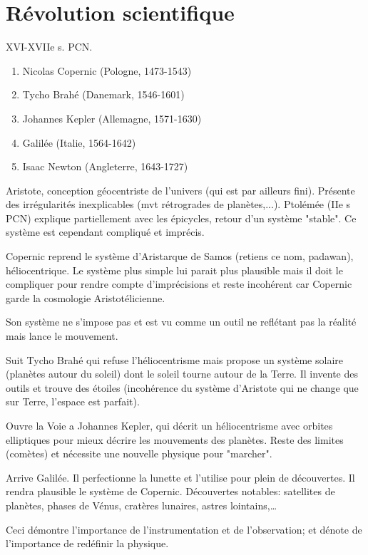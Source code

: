\documentclass{report}
\begin{document}
	\section{Révolution scientifique}
	
	XVI-XVIIe s. PCN.
	\begin{enumerate}
		\item Nicolas Copernic (Pologne, 1473-1543)
		\item Tycho Brahé (Danemark, 1546-1601)
		\item Johannes Kepler (Allemagne, 1571-1630)
		\item Galilée (Italie, 1564-1642)
		\item Isaac Newton (Angleterre, 1643-1727)
	\end{enumerate}
	
	Aristote, conception géocentriste de l'univers (qui est par ailleurs fini). Présente des irrégularités inexplicables (mvt rétrogrades de planètes,...). Ptolémée (IIe s PCN) explique partiellement avec les épicycles, retour d'un système "stable". Ce système est cependant compliqué et imprécis.
	
	Copernic reprend le système d'Aristarque de Samos (retiens ce nom, padawan), héliocentrique. Le système plus simple lui parait plus plausible mais il doit le compliquer pour rendre compte d'imprécisions et reste incohérent car Copernic garde la cosmologie Aristotélicienne.
	
	Son système ne s'impose pas et est vu comme un outil ne reflétant pas la réalité mais lance le mouvement.
	
	Suit Tycho Brahé  qui refuse l'héliocentrisme mais propose un système solaire (planètes autour du soleil) dont le soleil tourne autour de la Terre. Il invente des outils et trouve des étoiles (incohérence du système d'Aristote qui ne change que sur Terre, l'espace est parfait).
	
	Ouvre la Voie a Johannes Kepler, qui décrit un héliocentrisme avec orbites elliptiques pour mieux décrire les mouvements des planètes. Reste des limites (comètes) et nécessite une nouvelle physique pour "marcher".
	
	Arrive Galilée. Il perfectionne la lunette et l'utilise pour plein de découvertes. Il rendra plausible le système de Copernic. Découvertes notables: satellites de planètes, phases de Vénus, cratères lunaires, astres lointains,\dots
	
	Ceci démontre l'importance de l'instrumentation et de l'observation; et dénote de l'importance de redéfinir la physique.
	
\end{document}
